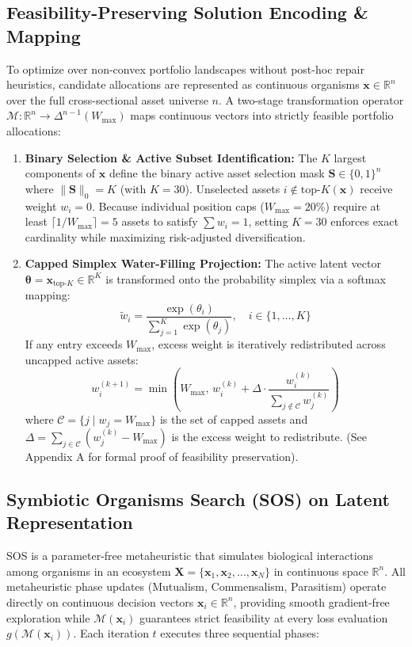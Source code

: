 \documentclass[11pt,a4paper]{article}
\begin{document}
\subsection{Feasibility-Preserving Solution Encoding & Mapping}
To optimize over non-convex portfolio landscapes without post-hoc repair heuristics, candidate allocations are represented as continuous organisms $\mathbf{x} \in \mathbb{R}^n$ over the full cross-sectional asset universe $n$. A two-stage transformation operator $\mathcal{M}: \mathbb{R}^n \to \Delta^{n-1}(W_{\max})$ maps continuous vectors into strictly feasible portfolio allocations:
\begin{enumerate}
    \item \textbf{Binary Selection & Active Subset Identification:} The $K$ largest components of $\mathbf{x}$ define the binary active asset selection mask $\mathbf{S} \in \{0, 1\}^n$ where $\|\mathbf{S}\|_0 = K$ (with $K=30$). Unselected assets $i \notin \text{top-}K(\mathbf{x})$ receive weight $w_i = 0$. Because individual position caps ($W_{\max}=20\%$) require at least $\lceil 1/W_{\max} \rceil = 5$ assets to satisfy $\sum w_i = 1$, setting $K=30$ enforces exact cardinality while maximizing risk-adjusted diversification.
    \item \textbf{Capped Simplex Water-Filling Projection:} The active latent vector $\boldsymbol{\theta} = \mathbf{x}_{\text{top-}K} \in \mathbb{R}^K$ is transformed onto the probability simplex via a softmax mapping:
    \begin{equation}
    \tilde{w}_i = \frac{\exp(\theta_i)}{\sum_{j=1}^K \exp(\theta_j)}, \quad i \in \{1, \dots, K\}
    \end{equation}
    If any entry exceeds $W_{\max}$, excess weight is iteratively redistributed across uncapped active assets:
    \begin{equation}
    w_i^{(k+1)} = \min\left(W_{\max}, \, w_i^{(k)} + \Delta \cdot \frac{w_i^{(k)}}{\sum_{j \notin \mathcal{C}} w_j^{(k)}}\right)
    \end{equation}
    where $\mathcal{C} = \{j \mid w_j = W_{\max}\}$ is the set of capped assets and $\Delta = \sum_{j \in \mathcal{C}} (w_j^{(k)} - W_{\max})$ is the excess weight to redistribute. (See Appendix A for formal proof of feasibility preservation).
\end{enumerate}

\subsection{Symbiotic Organisms Search (SOS) on Latent Representation}
SOS \cite{cheng2014} is a parameter-free metaheuristic that simulates biological interactions among organisms in an ecosystem $\mathbf{X} = \{\mathbf{x}_1, \mathbf{x}_2, \dots, \mathbf{x}_N\}$ in continuous space $\mathbb{R}^n$. All metaheuristic phase updates (Mutualism, Commensalism, Parasitism) operate directly on continuous decision vectors $\mathbf{x}_i \in \mathbb{R}^n$, providing smooth gradient-free exploration while $\mathcal{M}(\mathbf{x}_i)$ guarantees strict feasibility at every loss evaluation $g(\mathcal{M}(\mathbf{x}_i))$. Each iteration $t$ executes three sequential phases:
\end{document}
